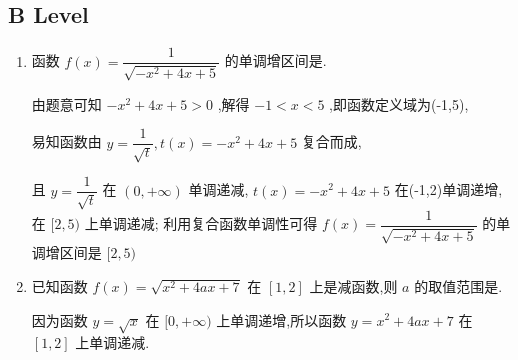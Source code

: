 \subsection*{B Level}
\begin{enumerate}
    \item 函数 $f\left( x\right)  = \dfrac{1}{\sqrt{-{x}^{2} + {4x} + 5}}$ 的单调增区间是.
    \begin{jieda}
        由题意可知 $- {x}^{2} + {4x} + 5 > 0$ ,解得 $- 1 < x < 5$ ,即函数定义域为(-1,5),
        
        易知函数由 $y = \dfrac{1}{\sqrt{t}},t\left( x\right)  =  - {x}^{2} + {4x} + 5$ 复合而成,
        
        且 $y = \dfrac{1}{\sqrt{t}}$ 在 $\left( {0, + \infty }\right)$ 单调递减, $t\left( x\right)  =  - {x}^{2} + {4x} + 5$ 在(-1,2)单调递增,在 $\lbrack 2,5)$ 上单调递减; 利用复合函数单调性可得 $f\left( x\right)  = \dfrac{1}{\sqrt{-{x}^{2} + {4x} + 5}}$ 的单调增区间是 $\lbrack 2,5)$
    \end{jieda}
    
    \item 已知函数 $f\left( x\right)  = \sqrt{{x}^{2} + {4ax} + 7}$ 在 $\left\lbrack  {1,2}\right\rbrack$ 上是减函数,则 $a$ 的取值范围是.
    \begin{jieda}
        因为函数 $y = \sqrt{x}$ 在 $\lbrack 0, + \infty )$ 上单调递增,所以函数 $y = {x}^{2} + {4ax} + 7$ 在 $\left\lbrack  {1,2}\right\rbrack$ 上单调递减.
        

\end{jieda}
\end{enumerate}
